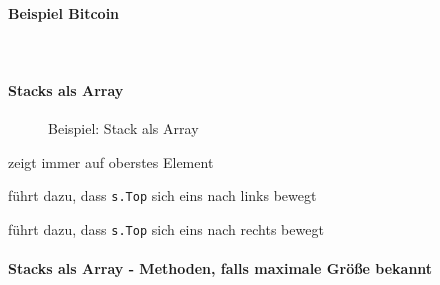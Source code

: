 \documentclass[
    ngerman,
    color=3b,
    dark_mode,
    summary,
    boxarc,
]{rubos-tuda-template}
\begin{document}
\paragraph{Beispiel Bitcoin}\mbox{}\\

\clearpage
\paragraph{Stacks als Array}\mbox{}
\begin{figure}[ht]
    \centering
    
    \caption{Beispiel: Stack als Array}
\end{figure}
\begin{description}[leftmargin=3cm,itemsep=1em]
    \item [\texttt{s.top}] zeigt immer auf oberstes Element
    \item [\texttt{pop()}] führt dazu, dass \texttt{s.Top} sich eins nach links bewegt
    \item [\texttt{push(k)}] führt dazu, dass \texttt{s.Top} sich eins nach rechts bewegt
\end{description}

\paragraph{Stacks als Array - Methoden, falls maximale Grö\ss{}e bekannt}\mbox{}
\end{document}
